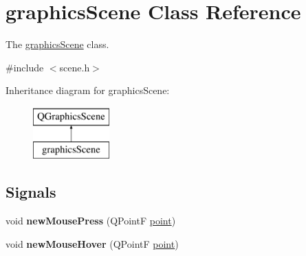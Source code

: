 \hypertarget{classgraphics_scene}{}\section{graphics\+Scene Class Reference}
\label{classgraphics_scene}


The \mbox{\hyperlink{classgraphics_scene}{graphics\+Scene}} class.  




{\ttfamily \#include $<$scene.\+h$>$}

Inheritance diagram for graphics\+Scene\+:\begin{figure}[H]
\begin{center}
\leavevmode
\includegraphics[height=2.000000cm]{classgraphics_scene}
\end{center}
\end{figure}
\subsection*{Signals}
\begin{DoxyCompactItemize}
\item 
\mbox{\label{classgraphics_scene_a24e9f3635a8d655eb907d31599b13378}} 
void {\bfseries new\+Mouse\+Press} (Q\+PointF \mbox{\hyperlink{classpoint}{point}})
\item 
\mbox{\label{classgraphics_scene_ad79f731b826d93f3c84d55f8d411666c}} 
void {\bfseries new\+Mouse\+Hover} (Q\+PointF \mbox{\hyperlink{classpoint}{point}})
\end{DoxyCompactItemize}
